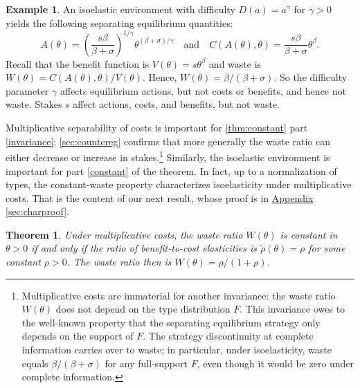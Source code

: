 \documentclass[12 pt]{article}
\newcommand{\appendixref}[1]{\hyperref[#1]{Appendix \ref{#1}}}
\newtheorem{theorem}{Theorem}
\theoremstyle{remark}
\theoremstyle{definition}
\newtheorem{example}{Example}
\def\typemin{0}
\newcommand{\elaR}{\tilde\rho}    %
\let\oldfootnote\footnote
\renewcommand\footnote[1]{\oldfootnote{\hspace{.5mm}#1}}
\begin{document}
\begin{example}
\label{eg:isoelastic}
An isoelastic environment with difficulty $D(a)=a^\gamma$ for  $\gamma>0$ yields the following separating equilibrium quantities:
    \[A(\theta)=\left(\frac{s \beta}{\beta+\sigma}\right)^{1 / \gamma} \theta^{(\beta+\sigma) / \gamma} \quad \text{and} \quad 
    C(A(\theta), \theta)=\frac{s \beta}{\beta+\sigma} \theta^\beta.\]
Recall that the benefit function is $V(\theta) = s \theta^\beta$ and waste is $W(\theta) = C(A(\theta),\theta)/V(\theta)$. Hence, $W(\theta)=\beta / (\beta+ \sigma)$. So the difficulty parameter $\gamma$ affects equilibrium actions, but not costs or benefits, and hence not waste. Stakes $s$ affect actions, costs, and benefits, but not waste.
\end{example}




Multiplicative separability of costs is important for \autoref{thm:constant} part \ref{invariance}; 
\autoref{sec:countereg} confirms that more generally the waste ratio can either decrease or increase in stakes.\footnote{Multiplicative costs are immaterial for another invariance: the  waste ratio $W(\theta)$ does not depend on the type distribution $F$. This invariance owes to the well-known property that the separating equilibrium strategy only depends on the support of $F$. The strategy discontinuity at complete information carries over to waste; in particular, under isoelasticity, waste equals $\beta/(\beta+\sigma)$ for any full-support $F$, even though it would be zero under complete information.
} Similarly, the isoelastic environment is important for part \ref{constant} of the theorem. In fact, up to a normalization of types, the constant-waste property characterizes isoelasticity under multiplicative costs. That is the content of our next result, whose proof is in \appendixref{sec:charproof}.



\begin{theorem}
\label{thm:char}
Under multiplicative costs, the waste ratio $W(\theta)$ is constant in $\theta > \typemin$ if and only if %
the ratio of benefit-to-cost elasticities is
$\elaR(\theta) = \rho$ 
for some constant $\rho > 0$. The waste ratio then is $W(\theta)=
\rho/(1 + \rho)$.
\end{theorem}
 
\end{document}
